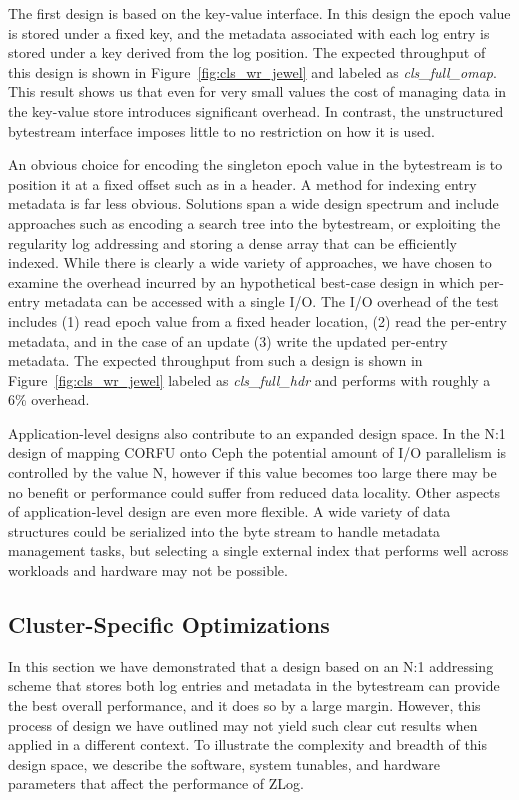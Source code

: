 \documentclass[10pt,twocolumn]{article}
\begin{document}
The first design is based on the key-value interface. In this design the epoch
value is stored under a fixed key, and the metadata associated with each log
entry is stored under a key derived from the log position. The expected throughput of
this design is shown in Figure~\ref{fig:cls_wr_jewel} and labeled as
\emph{cls\_full\_omap}. This result shows us that even for very small values
the cost of managing data in the key-value store introduces significant
overhead. In contrast, the unstructured bytestream interface imposes little
to no restriction on how it is used.

An obvious choice for encoding the singleton epoch value in the bytestream is
to position it at a fixed offset such as in a header. A method for indexing
entry metadata is far less obvious. Solutions span a wide design spectrum and
include approaches such as encoding a search tree into the bytestream, or
exploiting the regularity log addressing and storing a dense array that can be
efficiently indexed. While there is clearly a wide variety of approaches, we
have chosen to examine the overhead incurred by an hypothetical best-case
design in which per-entry metadata can be accessed with a single I/O. The I/O
overhead of the test includes (1) read epoch value from a fixed header
location, (2) read the per-entry metadata, and in the case of an update (3)
write the updated per-entry metadata. The expected throughput from such a
design is shown in Figure~\ref{fig:cls_wr_jewel} labeled as
\emph{cls\_full\_hdr} and performs with roughly a 6\% overhead.

Application-level designs also contribute to an expanded design space.  In the
N:1 design of mapping CORFU onto Ceph the potential amount of I/O parallelism
is controlled by the value N, however if this value becomes too large there may
be no benefit or performance could suffer from reduced data locality. Other
aspects of application-level design are even more flexible. A wide variety of
data structures could be serialized into the byte stream to handle metadata
management tasks, but selecting a single external index that performs well
across workloads and hardware may not be possible.

\subsection{Cluster-Specific Optimizations}

In this section we have demonstrated that a design based on an N:1 addressing
scheme that stores both log entries and metadata in the bytestream can provide
the best overall performance, and it does so by a large margin. However, this
process of design we have outlined may not yield such clear cut results when
applied in a different context. To illustrate the complexity and breadth of
this design space, we describe the software, system tunables, and hardware
parameters that affect the performance of ZLog. 
\end{document}

